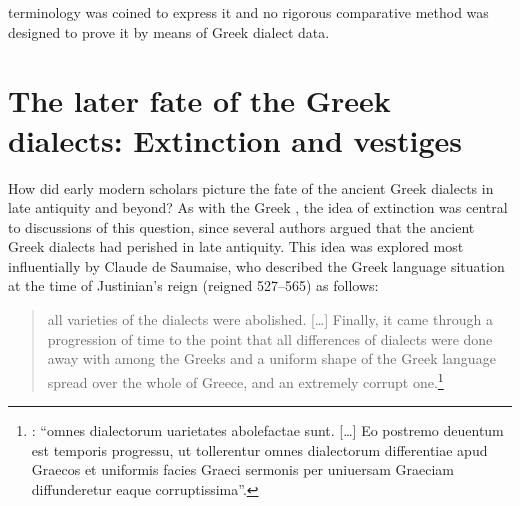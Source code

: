 terminology was coined to express it and no rigorous comparative method was designed to prove it by means of Greek dialect data.

\section{The later fate of the Greek dialects: Extinction and vestiges}\label{sec:5.5}\largerpage

How did early modern scholars picture the fate of the ancient Greek dialects in late antiquity and beyond? As with the Greek , the idea of extinction was central to discussions of this question, since several authors argued that the ancient Greek dialects had perished in late antiquity. This idea was explored most influentially by Claude de Saumaise, who described the Greek language situation at the time of Justinian’s reign (reigned 527–565) as follows:

\begin{quote}
all varieties of the dialects were abolished. […] Finally, it came through a progression of time to the point that all differences of dialects were done away with among the Greeks and a uniform shape of the Greek language spread over the whole of Greece, and an extremely corrupt one.\footnote{\citet[446--447]{Saumaise1643a}: “omnes dialectorum uarietates abolefactae sunt. […] Eo postremo deuentum est temporis progressu, ut tollerentur omnes dialectorum differentiae apud Graecos et uniformis facies Graeci sermonis per uniuersam Graeciam diffunderetur eaque corr\-up\-tiss\-ima”.}
\end{quote}

